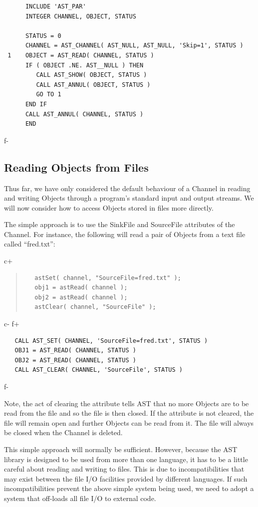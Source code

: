 \documentclass[twoside,11pt]{article}
\begin{document}
\small
\begin{verbatim}
      INCLUDE 'AST_PAR'
      INTEGER CHANNEL, OBJECT, STATUS

      STATUS = 0
      CHANNEL = AST_CHANNEL( AST_NULL, AST_NULL, 'Skip=1', STATUS )
 1    OBJECT = AST_READ( CHANNEL, STATUS )
      IF ( OBJECT .NE. AST__NULL ) THEN
         CALL AST_SHOW( OBJECT, STATUS )
         CALL AST_ANNUL( OBJECT, STATUS )
         GO TO 1
      END IF
      CALL AST_ANNUL( CHANNEL, STATUS )
      END
\end{verbatim}
\normalsize
f-

\subsection{\label{ss:channelsource}Reading Objects from Files}

Thus far, we have only considered the default behaviour of a Channel
in reading and writing Objects through a program's standard input and
output streams. We will now consider how to access Objects stored in
files more directly.

The simple approach is to use the SinkFile and SourceFile attributes of
the Channel. For instance, the following will read a pair of Objects from
a text file called ``fred.txt'':

c+
\begin{quote}
\small
\begin{verbatim}
   astSet( channel, "SourceFile=fred.txt" );
   obj1 = astRead( channel );
   obj2 = astRead( channel );
   astClear( channel, "SourceFile" );
\end{verbatim}
\normalsize
\end{quote}
c-
f+
\small
\begin{verbatim}
   CALL AST_SET( CHANNEL, 'SourceFile=fred.txt', STATUS )
   OBJ1 = AST_READ( CHANNEL, STATUS )
   OBJ2 = AST_READ( CHANNEL, STATUS )
   CALL AST_CLEAR( CHANNEL, 'SourceFile', STATUS )
\end{verbatim}
\normalsize
f-

Note, the act of clearing the attribute tells AST that no more Objects
are to be read from the file and so the file is then closed. If the
attribute is not cleared, the file will remain open and further Objects
can be read from it. The file will always be closed when the Channel is
deleted.

This simple approach will normally be sufficient. However, because the
AST library is designed to be used from more than one language, it has
to be a little careful about reading and writing to files. This is due
to incompatibilities that may exist between the file I/O facilities
provided by different languages. If such incompatibilities prevent the
above simple system being used, we need to adopt a system that off-loads
all file I/O to external code.
\end{document}
